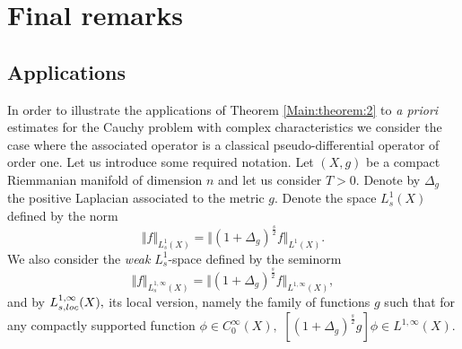 \documentclass[12pt, reqno]{amsart}
\theoremstyle{definition}
\theoremstyle{remark}
\numberwithin{equation}{section}
\begin{document}
\section{Final remarks}\label{Final:rem}

\subsection{Applications}
In order to illustrate the applications of Theorem \ref{Main:theorem:2}   to {\it a priori} estimates for the Cauchy problem with complex characteristics we consider the case where the associated operator is a classical pseudo-differential operator of order one. Let us introduce some required notation.  Let $(X,g)$ be a compact Riemmanian manifold of dimension $n$ and let us consider $T>0.$ Denote by $\Delta_g$ the positive Laplacian associated to the metric $g.$
Denote the space $L^{1}_s(X)$ defined by the norm
\begin{equation*}
    \Vert f\Vert_{L^{1}_s(X)}=\Vert(1+\Delta_g)^{\frac{s}{2}}f\Vert_{L^1(X)}.
\end{equation*}We also consider the {\it weak} $L^1_s$-space defined by the seminorm $$\Vert f\Vert_{L^{1,\infty}_s(X)}=\Vert(1+\Delta_g)^{\frac{s}{2}}f\Vert_{L^{1,\infty}(X)},$$ and by $L^{1,\infty}_{s,\textnormal{loc}}(X),$ its local version, namely the family of functions $g$ such that for any compactly supported function $\phi\in C^{\infty}_0(X),$ $[(1+\Delta_g)^{\frac{s}{2}}g]\phi\in L^{1,\infty}(X).$
\end{document}
